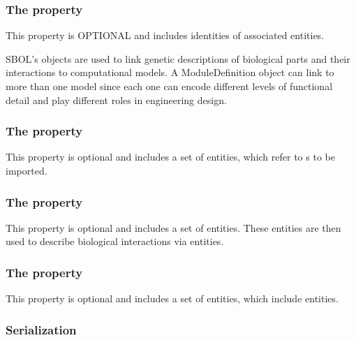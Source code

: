 \subsubsection*{The  property}\label{sec:models}
This property is OPTIONAL and includes identities of associated  entities.

SBOL's  objects are used to link genetic descriptions of biological parts and their interactions to computational models.
A ModuleDefinition object can link to more than one model since each one can encode different levels of functional detail and play different roles in engineering design. 


\subsubsection*{The  property}\label{sec:modules}
This property is optional and includes a set of  entities, which refer to s to be imported.

\subsubsection*{The  property}
\label{sec:functionalComponents}
This property is optional and includes a set of  entities. These entities are then used to describe biological interactions via  entities.


\subsubsection*{The  property}\label{sec:interactions}
This property is optional and includes a set of  entities, which include  entities.

\subsubsection*{Serialization}

